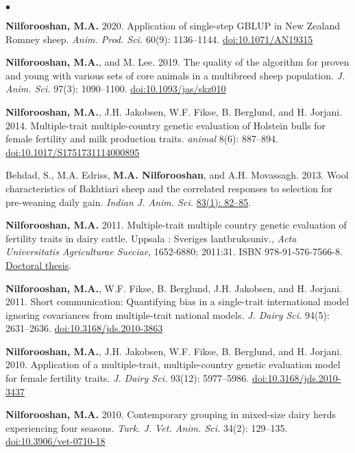 \documentclass[margin,line]{res}
\newenvironment{list2}{
  \begin{list}{$\bullet$}{%
      \setlength{\itemsep}{0in}
      \setlength{\parsep}{0in} \setlength{\parskip}{0in}
      \setlength{\topsep}{0in} \setlength{\partopsep}{0in}
      \setlength{\leftmargin}{0.2in}}}{\end{list}}
\begin{document}
\begin{resume}
\begin{list2}
\item {\bf Nilforooshan, M.A.} 2020. Application of single-step GBLUP in New Zealand Romney sheep. {\em Anim. Prod. Sci.} 60(9): 1136--1144. \href{https://doi.org/10.1071/AN19315}{doi:10.1071/AN19315}
\item {\bf Nilforooshan, M.A.}, and M. Lee. 2019. The quality of the algorithm for proven and young with various sets of core animals in a multibreed sheep population. {\em J. Anim. Sci.} 97(3): 1090--1100. \href{https://doi.org/10.1093/jas/skz010}{doi:10.1093/jas/skz010}
\item {\bf Nilforooshan, M.A.}, J.H. Jakobsen, W.F. Fikse, B. Berglund, and H. Jorjani. 2014. Multiple-trait multiple-country genetic evaluation of Holstein bulls for female fertility and milk production traits. {\em animal} 8(6): 887--894. \href{https://doi.org/10.1017/S1751731114000895}{doi:10.1017/S1751731114000895}
\item Behdad, S., M.A. Edriss, {\bf M.A. Nilforooshan}, and A.H. Movassagh. 2013. Wool characteristics of Bakhtiari sheep and the correlated responses to selection for pre-weaning daily gain. {\em Indian J. Anim. Sci.} \href{http://epubs.icar.org.in/ejournal/index.php/IJAnS/article/view/26453}{83(1): 82--85}.
\item {\bf Nilforooshan, M.A.} 2011. Multiple-trait multiple country genetic evaluation of fertility traits in dairy cattle. Uppsala : Sveriges lantbruksuniv., {\em Acta Universitatis Agriculturae Sueciae}, 1652-6880; 2011:31. ISBN 978-91-576-7566-8. \href{https://pub.epsilon.slu.se/8094}{Doctoral thesis}.
\item {\bf Nilforooshan, M.A.}, W.F. Fikse, B. Berglund, J.H. Jakobsen, and H. Jorjani. 2011. Short communication: Quantifying bias in a single-trait international model ignoring covariances from multiple-trait national models. {\em J. Dairy Sci.} 94(5): 2631--2636. \href{https://doi.org/10.3168/jds.2010-3863}{doi:10.3168/jds.2010-3863}
\item {\bf Nilforooshan, M.A.}, J.H. Jakobsen, W.F. Fikse, B. Berglund, and H. Jorjani. 2010. Application of a multiple-trait, multiple-country genetic evaluation model for female fertility traits. {\em J. Dairy Sci.} 93(12): 5977--5986. \href{https://doi.org/10.3168/jds.2010-3437}{doi:10.3168/jds.2010-3437}
\item {\bf Nilforooshan, M.A.} 2010. Contemporary grouping in mixed-size dairy herds experiencing four seasons. {\em Turk. J. Vet. Anim. Sci.} 34(2): 129--135. \href{https://doi.org/10.3906/vet-0710-18}{doi:10.3906/vet-0710-18}

\end{list2}
\end{resume}
\end{document}
